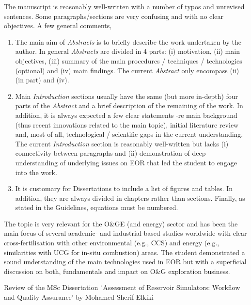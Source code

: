 \documentclass[14pt,twoside]{report}
\begin{document}
The manuscript is reasonably well-written with a number of typos and unrevised sentences. Some paragraphs/sections are very confusing and with no clear objectives. A few general comments,
\begin{enumerate}
\item The main aim of {\it Abstracts} is to briefly describe the work undertaken by the author. In general {\it Abstracts} are divided in 4 parts: (i) motivation, (ii) main objectives, (iii) summary of the main procedures / techniques / technologies (optional) and (iv) main findings. The current {\it Abstract} only encompass (ii) (in part) and (iv).
\item Main {\it Introduction} sections usually have the same (but more in-depth) four parts of the {\it Abstract} and a brief description of the remaining of the work. In addition, it is always expected a few clear statements -re main background (thus recent innovations related to the main topic), initial literature review and, most of all, technological / scientific gaps in the current understanding. The current {\it Introduction} section is reasonably well-written but lacks (i) connectivity between paragraphs and (ii) demonstration of deep understanding of underlying issues on EOR that led the student to engage into the work.
\item It is customary for Dissertations to include a list of figures and tables. In addition, they are always divided in chapters rather than  sections. Finally, as stated in the Guidelines, equations must be numbered.
\end{enumerate}

The topic is very relevant for the O$\&$GE (and energy) sector and has been the main focus of several academic- and industrial-based studies worldwide with clear cross-fertilisation with other environmental (e.g., CCS) and energy (e.g., similarities with UCG for in-situ combustion) areas. The student demonstrated a sound understanding of the main technologies used in EOR but with a superficial discussion on both, fundamentals and impact on O$\&$G exploration business.    



\clearpage


\bigskip

\begin{center}
{\Large Review of the MSc Dissertation $\lq$Assessment of Reservoir Simulators: Workflow and Quality Assurance' by Mohamed Sherif Elkiki}
\end{center}
\end{document}

